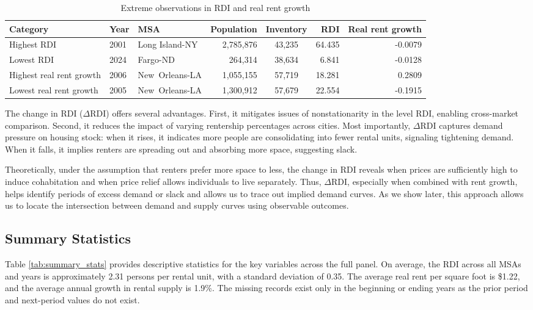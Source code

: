 \documentclass[APA,Times1COL]{WileyNJDv5} %
\begin{document}
\begin{table}[ht]
	\centering
	\caption{Extreme observations in RDI and real rent growth}
	\label{tab:extremes}
	\begin{tabular}{lllrcrr}
		\toprule
		Category & Year & MSA & Population & Inventory & RDI & Real rent growth \\
		\midrule
		Highest RDI                   & 2001 & Long Island-NY           & 2,785,876 &  43,235 & 64.435 & -0.0079     \\
		Lowest RDI                    & 2024 & Fargo-ND                 &   264,314 &  38,634 &  6.841 & -0.0128      \\
		Highest real rent growth      & 2006 & New Orleans-LA           & 1,055,155 &  57,719 & 18.281 & 0.2809   \\
		Lowest  real rent growth      & 2005 & New Orleans-LA           & 1,300,912 &  57,679 & 22.554 & -0.1915  \\
		\bottomrule
	\end{tabular}
\end{table}



The change in RDI (\( \Delta \text{RDI} \)) offers several advantages. First, it mitigates issues of nonstationarity in the level RDI, enabling cross-market comparison. Second, it reduces the impact of varying rentership percentages across cities. Most importantly, \( \Delta \text{RDI} \) captures demand pressure on housing stock: when it rises, it indicates more people are consolidating into fewer rental units, signaling tightening demand. When it falls, it implies renters are spreading out and absorbing more space, suggesting slack.

Theoretically, under the assumption that renters prefer more space to less, the change in RDI reveals when prices are sufficiently high to induce cohabitation and when price relief allows individuals to live separately. Thus, \( \Delta \text{RDI} \), especially when combined with rent growth, helps identify periods of excess demand or slack and allows us to trace out implied demand curves. As we show later, this approach allows us to locate the intersection between demand and supply curves using observable outcomes.


\subsection{Summary Statistics}
Table \ref{tab:summary_stats} provides descriptive statistics for the key variables across the full panel. On average, the RDI across all MSAs and years is approximately 2.31 persons per rental unit, with a standard deviation of 0.35. The average real rent per square foot is \$1.22, and the average annual growth in rental supply is 1.9\%. The missing records exist only in the beginning or ending years as the prior period and next-period values do not exist. 
\end{document}

